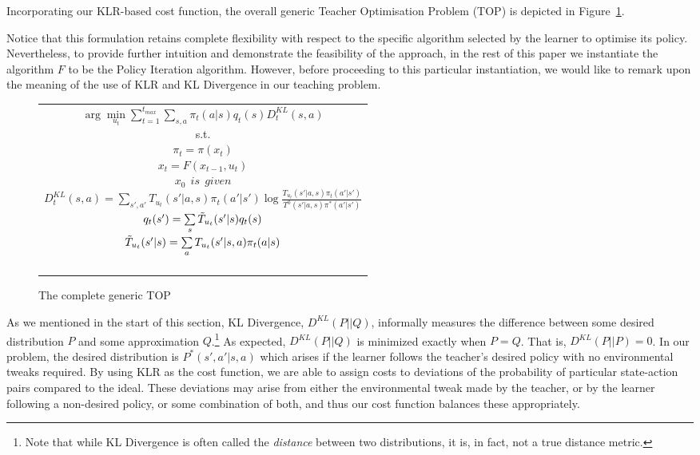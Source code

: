 Incorporating our KLR-based cost function, the overall generic Teacher
Optimisation Problem (TOP) is depicted in Figure~\ref{t_opt}. 

Notice
that this formulation retains complete flexibility with respect to the
specific algorithm selected by the learner to optimise its
policy. Nevertheless, to provide further intuition and demonstrate the
feasibility of the approach, in the rest of this paper we instantiate
the algorithm $F$ to be the Policy Iteration algorithm. However,
before proceeding  to this particular instantiation, we would like to
remark upon the meaning of the use of KLR and KL Divergence in our teaching problem.

\begin{figure}[ht]
\begin{tabular}{|c|} \hline \parbox{3.2 in} {\center 
$\arg\min\limits_{u_t}\sum\limits_{t=1}^{t_{max}}\sum\limits_{s,a}\pi_t(a|s)q_t(s)D^{KL}_t(s,a)$\\
s.t.\\
$\pi_t=\pi(x_t)$\\
$x_t=F(x_{t-1},u_t)$\\
$x_0\ \ \displaystyle{is\ \ given}$\\
$D^{KL}_t(s,a)=\sum\limits_{s',a'}T_{u_t}(s'|a,s)\pi_t(a'|s')\log\frac{T_{u_t}(s'|a,s)\pi_t(a'|s')}{T^0(s'|a,s)\pi^*(a'|s')}$\\
$q_t(s')=\sum\limits_s\Tilde{T}_{u_t}(s'|s)q_t(s)$\\
$\Tilde{T}_{u_t}(s'|s)=\sum\limits_aT_{u_t}(s'|s,a)\pi_t(a|s)$\\\ \\
}\\ \hline \end{tabular}
\caption{\label{t_opt}The complete generic TOP}
\end{figure}

As we mentioned in the start of this section, KL Divergence, $D^{KL}(P||Q)$, informally measures 
the
difference between some desired distribution $P$ and some approximation $Q$.\footnote{Note that 
while KL Divergence is often called the \emph{distance} between two distributions, it is, in fact, not 
a true distance metric.}  As expected, $D^{KL}(P||Q)$ is minimized exactly when $P=Q$. That is, 
$D^{KL}(P||P)=0$.  In our problem, the  desired distribution is $P^*(s',a'|s,a)$ which arises if the 
learner follows the teacher's desired policy with no environmental tweaks required.  
By using KLR as the cost function, we are able to assign costs to deviations of the probability of  
particular state-action pairs compared to the ideal. These deviations may arise from either the 
environmental tweak  made by the teacher, or by the learner following a non-desired policy, or 
some combination of both, and thus our cost function balances these appropriately.



